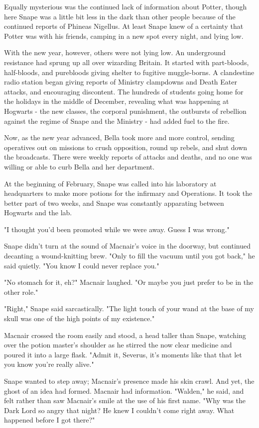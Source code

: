 Equally mysterious was the continued lack of information about Potter, though here Snape was a little bit less in the dark than other people because of the continued reports of Phineas Nigellus. At least Snape knew of a certainty that Potter was with his friends, camping in a new spot every night, and lying low.

With the new year, however, others were not lying low. An underground resistance had sprung up all over wizarding Britain. It started with part-bloods, half-bloods, and purebloods giving shelter to fugitive muggle-borns. A clandestine radio station began giving reports of Ministry clampdowns and Death Eater attacks, and encouraging discontent. The hundreds of students going home for the holidays in the middle of December, revealing what was happening at Hogwarts - the new classes, the corporal punishment, the outbursts of rebellion against the regime of Snape and the Ministry - had added fuel to the fire.

Now, as the new year advanced, Bella took more and more control, sending operatives out on missions to crush opposition, round up rebels, and shut down the broadcasts. There were weekly reports of attacks and deaths, and no one was willing or able to curb Bella and her department.

At the beginning of February, Snape was called into his laboratory at headquarters to make more potions for the infirmary and Operations. It took the better part of two weeks, and Snape was constantly apparating between Hogwarts and the lab.

"I thought you'd been promoted while we were away. Guess I was wrong."

Snape didn't turn at the sound of Macnair's voice in the doorway, but continued decanting a wound-knitting brew. "Only to fill the vacuum until you got back," he said quietly. "You know I could never replace you."

"No stomach for it, eh?" Macnair laughed. "Or maybe you just prefer to be in the other role."

"Right," Snape said sarcastically. "The light touch of your wand at the base of my skull was one of the high points of my existence."

Macnair crossed the room easily and stood, a head taller than Snape, watching over the potion master's shoulder as he stirred the now clear medicine and poured it into a large flask. "Admit it, Severus, it's moments like that that let you know you're really alive."

Snape wanted to step away; Macnair's presence made his skin crawl. And yet, the ghost of an idea had formed. Macnair had information. "Walden," he said, and felt rather than saw Macnair's smile at the use of his first name. "Why was the Dark Lord so angry that night? He knew I couldn't come right away. What happened before I got there?"

